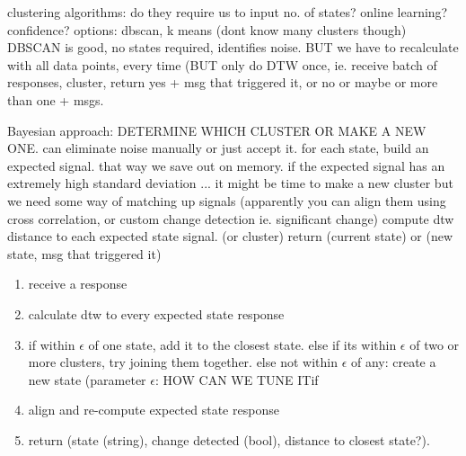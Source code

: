\documentclass[11pt, a4paper]{article}
\begin{document}
clustering algorithms: do they require us to input no. of states? online learning? confidence?
options: dbscan, k means (dont know many clusters though)
DBSCAN is good, no states required, identifies noise. BUT we have to recalculate with all data points, every time (BUT only do DTW once, ie. 
receive batch of responses, cluster, return yes + msg that triggered it, or no or maybe or more than one + msgs.

Bayesian approach: DETERMINE WHICH CLUSTER OR MAKE A NEW ONE. can eliminate noise manually or just accept it.
for each state, build an expected signal. that way we save out on memory. 
if the expected signal has an extremely high standard deviation ... it might be time to make a new cluster
but we need some way of matching up signals (apparently you can align them using cross correlation, or custom change detection ie. significant change)
compute dtw distance to each expected state signal. (or cluster)
return (current state) or (new state, msg that triggered it)
 
%

\begin{enumerate}
    \item receive a response
    \item calculate dtw to every expected state response
    \item if within $\epsilon$ of one state, add it to the closest state. else if its within $\epsilon$ of two or more clusters, try joining them together. else not within $\epsilon$ of any: create a new state (parameter $\epsilon$: HOW CAN WE TUNE ITif 
    \item align and re-compute expected state response
    \item return (state (string), change detected (bool), distance to closest state?).
\end{enumerate}
\end{document}
